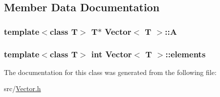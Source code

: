\subsection{Member Data Documentation}
\hypertarget{class_vector_ac1512c9d8f28d4253e52967d64b803d9}{}
\subsubsection[{A}]{\setlength{\rightskip}{0pt plus 5cm}template$<$class T$>$ T$\ast$ {\bf Vector}$<$ T $>$\+::A\hspace{0.3cm}{\ttfamily [private]}}\label{class_vector_ac1512c9d8f28d4253e52967d64b803d9}
\hypertarget{class_vector_aac9657cb0934d133a2d9868f0661ac01}{}
\subsubsection[{elements}]{\setlength{\rightskip}{0pt plus 5cm}template$<$class T$>$ int {\bf Vector}$<$ T $>$\+::elements\hspace{0.3cm}{\ttfamily [private]}}\label{class_vector_aac9657cb0934d133a2d9868f0661ac01}


The documentation for this class was generated from the following file\+:\begin{DoxyCompactItemize}
\item 
src/\hyperlink{_vector_8h}{Vector.\+h}\end{DoxyCompactItemize}
